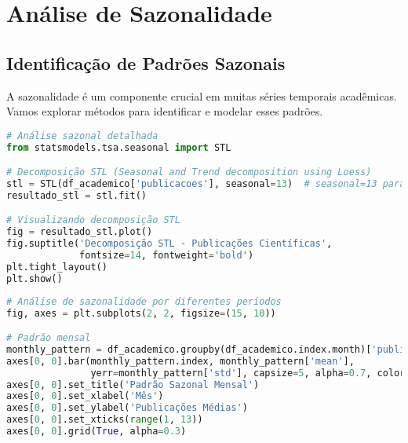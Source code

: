 \section{Análise de Sazonalidade}

\subsection{Identificação de Padrões Sazonais}

A sazonalidade é um componente crucial em muitas séries temporais acadêmicas. Vamos explorar métodos para identificar e modelar esses padrões.

\begin{pythonbox}
\begin{lstlisting}[language=Python]
# Análise sazonal detalhada
from statsmodels.tsa.seasonal import STL

# Decomposição STL (Seasonal and Trend decomposition using Loess)
stl = STL(df_academico['publicacoes'], seasonal=13)  # seasonal=13 para dados mensais
resultado_stl = stl.fit()

# Visualizando decomposição STL
fig = resultado_stl.plot()
fig.suptitle('Decomposição STL - Publicações Científicas', 
             fontsize=14, fontweight='bold')
plt.tight_layout()
plt.show()
\end{lstlisting}
\end{pythonbox}

\begin{pythonbox}
\begin{lstlisting}[language=Python]
# Análise de sazonalidade por diferentes períodos
fig, axes = plt.subplots(2, 2, figsize=(15, 10))

# Padrão mensal
monthly_pattern = df_academico.groupby(df_academico.index.month)['publicacoes'].agg(['mean', 'std'])
axes[0, 0].bar(monthly_pattern.index, monthly_pattern['mean'], 
               yerr=monthly_pattern['std'], capsize=5, alpha=0.7, color='skyblue')
axes[0, 0].set_title('Padrão Sazonal Mensal')
axes[0, 0].set_xlabel('Mês')
axes[0, 0].set_ylabel('Publicações Médias')
axes[0, 0].set_xticks(range(1, 13))
axes[0, 0].grid(True, alpha=0.3)
\end{lstlisting}
\end{pythonbox}

